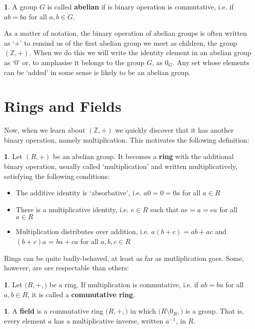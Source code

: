 \documentclass[oneside,english]{amsbook}
\numberwithin{section}{chapter}
\theoremstyle{plain}
\theoremstyle{definition}
\newtheorem{defn}[thm]{\protect\definitionname}
\providecommand{\definitionname}{Definition}
\begin{document}
\begin{defn}
	A group $G$ is called \textbf{abelian} if is binary operation is commutative, i.e. if $ab = ba$ for all $a, b\in G$.
\end{defn}

As a matter of notation, the binary operation of abelian groups is often written as `$+$' to remind us of the first abelian group we meet as children, the group $(\mathbb{Z}, +)$. When we do this we will write the identity element in an abelian group as `$0$' or, to amphasise it belongs to the group $G$, as $0_G$. Any set whose elements can be `added' in some sense is likely to be an abelian group. 

\section{Rings and Fields}

Now, when we learn about $(\mathbb{Z}, +)$ we quickly discover that it has another binary operation, namely multiplication. This motivates the following definition: 

\begin{defn}Let $(R, +)$ be an abelian group. It becomes a \textbf{ring} with the additional binary operation, usually called `multiplication' and written multiplicatively, satisfying the following conditions:
	\begin{itemize}
		\item{The additive identity is `absorbative', i.e. $a0 = 0 = 0a$ for all $a\in R$}
		\item{There is a multiplicative identity, i.e. $e\in R$ such that $ae = a = ea$ for all $a\in R$}
		\item{Multiplication distributes over addition, i.e. $a(b + c) = ab + ac$ and $(b + c)a$ = $ba + ca$ for all $a, b, c\in R$}
	\end{itemize}
\end{defn}

Rings can be quite badly-behaved, at least as far as mutliplication goes. Some, however, are ore respectable than others:

\begin{defn}
	Let $(R, +, \dot)$ be a ring. If multiplication is commutative, i.e. if $ab = ba$ for all $a, b\in R$, it is called a \textbf{commutative ring}.
\end{defn}

\begin{defn}
	A \textbf{field} is a commutative ring $(R, +, \dot)$ in which $(R\setminus 0_R, \dot)$ is a  group. That is, every element $a$ has a multiplicative inverse, written $a^{-1}$, in $R$.
\end{defn}
\end{document}
